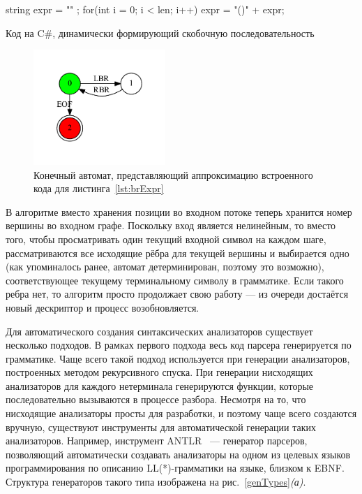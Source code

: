 \documentclass[14pt]{matmex-diploma}
\begin{document}
\begin{listing}
\begin{pyglist}[language=csharp,numbers=left,numbersep=5pt]
 string expr = "" ;
 for(int i = 0; i < len; i++) 
 {
     expr = "()" + expr;
 }
\end{pyglist}
\caption{Код на C\#, динамически формирующий скобочную последовательность}
\label{lst:brExpr}
\end{listing}

\begin{figure}[h]
 \centering
 \includegraphics[width=5cm]{pics/input.pdf}
 \caption{Конечный автомат, представляющий аппроксимацию встроенного кода для листинга~\ref{lst:brExpr} }
 \label{input}
\end{figure}

В алгоритме вместо хранения позиции во входном потоке теперь хранится номер вершины во входном графе. Поскольку вход является нелинейным, то вместо того, чтобы просматривать один текущий входной символ на каждом шаге, рассматриваются все исходящие рёбра для текущей вершины и выбирается одно (как упоминалось ранее, автомат детерминирован, поэтому это возможно), соответствующее текущему терминальному символу в грамматике. Если такого ребра нет, то алгоритм просто продолжает свою работу --- из очереди достаётся новый дескриптор и процесс возобновляется. 

Для автоматического создания синтаксических анализаторов существует несколько подходов. В рамках первого подхода весь код парсера генерируется по грамматике. Чаще всего такой подход используется при генерации анализаторов, построенных методом рекурсивного спуска. При генерации нисходящих анализаторов для каждого нетерминала генерируются функции, которые последовательно вызываются в процессе разбора. Несмотря на то, что нисходящие анализаторы просты для разработки, и поэтому чаще всего создаются вручную, существуют инструменты для автоматической генерации таких анализаторов. Например, инструмент ANTLR~\cite{antlr} --- генератор парсеров, позволяющий автоматически создавать анализаторы на одном из целевых языков программирования по описанию LL(*)-грамматики на языке, близком к EBNF. Структура генераторов такого типа изображена на рис.~\ref{genTypes}{\it (а)}.
\end{document}
